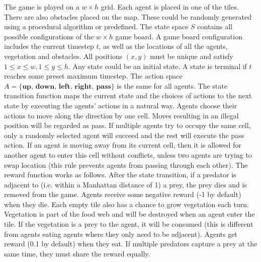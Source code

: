 \documentclass[]{interact}
\theoremstyle{plain}%
\theoremstyle{definition}
\theoremstyle{remark}
\begin{document}
The game is played on a $w \times h$ grid. Each agent is placed in one of the tiles. There are also obstacles placed on the map. These could be randomly generated using a procedural algorithm or predefined. The state space $S$ contains all possible configurations of the $w \times h$ game board. A game board configuration includes the current timestep $t$, as well as the locations of all the agents, vegetation and obstacles. All positions $(x, y)$ must be unique and satisfy $1 \le x \le w, 1 \le y \le h$. Any state could be an initial state. A state is terminal if $t$ reaches some preset maximum timestep. The action space $A = \{\textbf{up, down, left, right, pass}\}$ is the same for all agents. The state transition function maps the current state and the choices of actions to the next state by executing the agents' actions in a natural way. Agents choose their actions to move along the direction by one cell. Moves resulting in an illegal position will be regarded as pass. If multiple agents try to occupy the same cell, only a randomly selected agent will succeed and the rest will execute the pass action. If an agent is moving away from its current cell, then it is allowed for another agent to enter this cell without conflicts, unless two agents are trying to swap location (this rule prevents agents from passing through each other). The reward function works as follows. After the state transition, if a predator is adjacent to (i.e. within a Manhattan distance of 1) a prey, the prey dies and is removed from the game. Agents receive some negative reward (-1 by default) when they die. Each empty tile also has a chance to grow vegetation each turn. Vegetation is part of the food web and will be destroyed when an agent enter the tile. If the vegetation is a prey to the agent, it will be consumed (this is different from agents eating agents where they only need to be adjacent). Agents get reward (0.1 by default) when they eat. If multiple predators capture a prey at the same time, they must share the reward equally.
\end{document}
